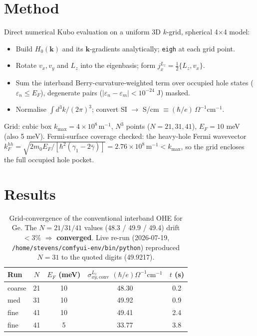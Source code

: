 \documentclass[11pt]{article}
\begin{document}
\section{Method}
Direct numerical Kubo evaluation on a uniform 3D $k$-grid, spherical 4$\times$4 model:
\begin{itemize}
\item Build $H_0(\mathbf k)$ and its $\mathbf k$-gradients analytically; \texttt{eigh} at each grid point.
\item Rotate $v_x,v_y$ and $L_z$ into the eigenbasis; form $j^{L_z}_x=\tfrac12\{L_z,v_x\}$.
\item Sum the interband Berry-curvature-weighted term over occupied hole states
($\varepsilon_n\le E_F$), degenerate pairs ($|\varepsilon_n-\varepsilon_m|<10^{-24}$ J) masked.
\item Normalise $\int d^3k/(2\pi)^3$; convert SI $\to$ S/cm $\equiv (\hbar/e)\,\Omega^{-1}\mathrm{cm}^{-1}$.
\end{itemize}
Grid: cubic box $k_{\max}=4\times10^8\,\mathrm{m}^{-1}$, $N^3$ points ($N=21,31,41$),
$E_F=10$ meV (also 5 meV). Fermi-surface coverage checked: the heavy-hole Fermi wavevector
$k_F^{hh}=\sqrt{2m_0 E_F/[\hbar^2(\gamma_1-2\bar\gamma)]}=2.76\times10^8\,\mathrm{m}^{-1}<k_{\max}$,
so the grid encloses the full occupied hole pocket.

\section{Results}
\begin{table}[h]\centering
\begin{tabular}{lcccc}
\toprule
Run & $N$ & $E_F$ (meV) & $\sigma^{L_z}_{xy,\mathrm{conv}}$ $(\hbar/e)\Omega^{-1}\mathrm{cm}^{-1}$ & $t$ (s)\\
\midrule
coarse & 21 & 10 & 48.30 & 0.2\\
med    & 31 & 10 & 49.92 & 0.9\\
fine   & 41 & 10 & 49.41 & 2.4\\
fine   & 41 & 5  & 33.77 & 3.8\\
\bottomrule
\end{tabular}
\caption{Grid-convergence of the conventional interband OHE for Ge. The $N=21/31/41$ values
(48.3 / 49.9 / 49.4) drift $<3\%$ $\Rightarrow$ \textbf{converged}. Live re-run (2026-07-19,
\texttt{/home/stevens/comfyui-env/bin/python}) reproduced $N=31$ to the quoted digits (49.9217).}
\end{table}
\end{document}
